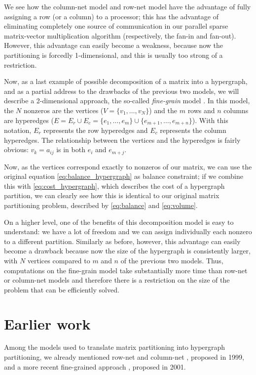 We see how the column-net model and row-net model have the advantage of fully assigning a row (or a column) to a processor; this has the advantage of eliminating completely one source of communication in our parallel sparse matrix-vector multiplication algorithm (respectively, the fan-in and fan-out). However, this advantage can easily become a weakness, because now the partitioning is forcedly 1-dimensional, and this is usually too strong of a restriction.

Now, as a last example of possible decomposition of a matrix into a hypergraph, and as a partial address to the drawbacks of the previous two models, we will describe a 2-dimensional approach, the so-called \emph{fine-grain} model \cite{hypergraph_finegrain}. In this model, the $N$ nonzeros are the vertices ($V = \{ v_1,\dots,v_N\}$) and the $m$ rows and $n$ columns are hyperedges ($E = E_r \cup E_c = \{ e_1,\dots,e_m \} \cup \{e_{m+1},\dots,e_{m+n}\}$). With this notation, $E_r$ represents the row hyperedges and $E_c$ represents the column hyperedges. The relationship between the vertices and the hyperedges is fairly obvious: $v_k = a_{ij}$ is in both $e_i$ and $e_{m+j}$.

Now, as the vertices correspond exactly to nonzeros of our matrix, we can use the original equation \eqref{eq:balance_hypergraph} as balance constraint; if we combine this with \eqref{eq:cost_hypergraph}, which describes the cost of a hypergraph partition, we can clearly see how this is identical to our original matrix partitioning problem, described by \eqref{eq:balance} and \eqref{eq:volume}.

On a higher level, one of the benefits of this decomposition model is easy to understand: we have a lot of freedom and we can assign individually each nonzero to a different partition. Similarly as before, however, this advantage can easily become a drawback because now the size of the hypergraph is consistently larger, with $N$ vertices compared to $m$ and $n$ of the previous two models. Thus, computations on the fine-grain model take substantially more time than row-net or column-net models and therefore there is a restriction on the size of the problem that can be efficiently solved.

\section{Earlier work} \label{sec:earlier_work} 

Among the models used to translate matrix partitioning into hypergraph partitioning, we already mentioned row-net and column-net \cite{hypergraph_model}, proposed in 1999, and a more recent fine-grained approach \cite{hypergraph_finegrain}, proposed in 2001. 

